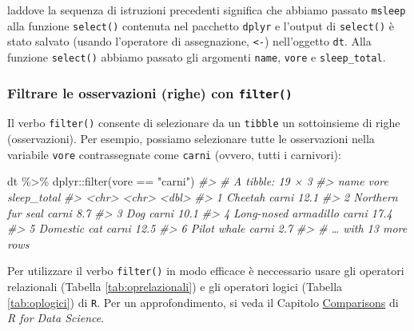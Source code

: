 \documentclass[
  10pt,
  italian,
  a4paper,
  extrafontsizes,onecolumn,openright
  ]{memoir}
\newenvironment{Shaded}{\begin{snugshade}}{\end{snugshade}}
\newcommand{\CommentTok}[1]{\textcolor[rgb]{0.56,0.35,0.01}{\textit{#1}}}
\newcommand{\FunctionTok}[1]{\textcolor[rgb]{0.00,0.00,0.00}{#1}}
\newcommand{\NormalTok}[1]{#1}
\newcommand{\SpecialCharTok}[1]{\textcolor[rgb]{0.00,0.00,0.00}{#1}}
\newcommand{\StringTok}[1]{\textcolor[rgb]{0.31,0.60,0.02}{#1}}
\begin{document}
\noindent
laddove la sequenza di istruzioni precedenti significa che abbiamo passato \texttt{msleep} alla funzione \texttt{select()} contenuta nel pacchetto \texttt{dplyr} e l'output di \texttt{select()} è stato salvato (usando l'operatore di assegnazione, \texttt{\textless{}-}) nell'oggetto \texttt{dt}. Alla funzione \texttt{select()} abbiamo passato gli argomenti \texttt{name}, \texttt{vore} e \texttt{sleep\_total}.

\hypertarget{filtrare-le-osservazioni-righe-con-filter}{%
\subsubsection{\texorpdfstring{Filtrare le osservazioni (righe) con \texttt{filter()}}{Filtrare le osservazioni (righe) con filter()}}\label{filtrare-le-osservazioni-righe-con-filter}}

Il verbo \texttt{filter()} consente di selezionare da un \texttt{tibble} un sottoinsieme di righe (osservazioni). Per esempio, possiamo selezionare tutte le osservazioni nella variabile \texttt{vore} contrassegnate come \texttt{carni} (ovvero, tutti i carnivori):

\begin{Shaded}
\begin{Highlighting}[]
\NormalTok{dt }\SpecialCharTok{\%\textgreater{}\%}
\NormalTok{  dplyr}\SpecialCharTok{::}\FunctionTok{filter}\NormalTok{(vore }\SpecialCharTok{==} \StringTok{"carni"}\NormalTok{)}
\CommentTok{\#\textgreater{} \# A tibble: 19 × 3}
\CommentTok{\#\textgreater{}   name                 vore  sleep\_total}
\CommentTok{\#\textgreater{}   \textless{}chr\textgreater{}                \textless{}chr\textgreater{}       \textless{}dbl\textgreater{}}
\CommentTok{\#\textgreater{} 1 Cheetah              carni        12.1}
\CommentTok{\#\textgreater{} 2 Northern fur seal    carni         8.7}
\CommentTok{\#\textgreater{} 3 Dog                  carni        10.1}
\CommentTok{\#\textgreater{} 4 Long{-}nosed armadillo carni        17.4}
\CommentTok{\#\textgreater{} 5 Domestic cat         carni        12.5}
\CommentTok{\#\textgreater{} 6 Pilot whale          carni         2.7}
\CommentTok{\#\textgreater{} \# … with 13 more rows}
\end{Highlighting}
\end{Shaded}

Per utilizzare il verbo \texttt{filter()} in modo efficace è neccessario usare gli operatori relazionali (Tabella \ref{tab:oprelazionali}) e gli operatori logici (Tabella \ref{tab:oplogici}) di \texttt{R}. Per un approfondimento, si veda il Capitolo \href{https://r4ds.had.co.nz/transform.html}{Comparisons} di \emph{R for Data Science}.
\end{document}
